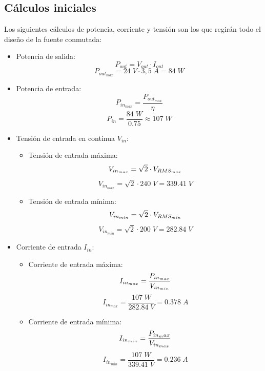 \documentclass[11pt, a4paper]{article}
\begin{document}
\subsection{Cálculos iniciales}
Los siguientes cálculos de potencia, corriente y tensión son los que regirán todo el diseño de la fuente conmutada:
\begin{itemize}
	\item Potencia de salida:
	\begin{equation}
	P_{out} = V_{out} \cdot I_{out}
	\label{Pout}
	\end{equation}
	\[ P_{out_{max}} = 24 \; V \cdot 3,5 \; A = 84 \;W \]
	\item Potencia de entrada:
	\begin{equation}
		P_{in_{max}} = \frac{P_{out_{max}}}{\eta}
	\label{Pin}
	\end{equation}
	\[ P_{in} = \frac{84 \; W}{0.75} \approx 107 \; W \]
	\item Tensión de entrada en continua $V_{in}$:
		\begin{itemize}
			\item Tensión de entrada máxima:
			\begin{equation}
				V_{in_{max}} = \sqrt{2} \cdot V_{RMS_{max}}
				\label{Vin_{max}}
			\end{equation}
			\[ V_{in_{max}} = \sqrt{2} \cdot 240 \; V = 339.41 \; V \]
			\item Tensión de entrada mínima:
			\begin{equation}
				V_{in_{min}} = \sqrt{2} \cdot V_{RMS_{min}}
				\label{Vin_{min}}
			\end{equation}
			\[ V_{in_{min}} = \sqrt{2} \cdot 200 \; V = 282.84 \; V \]
		\end{itemize}
	\item Corriente de entrada $I_{in}$:
	\begin{itemize}
		\item Corriente de entrada máxima:
		\begin{equation}
			I_{in_{max}} = \frac{P_{in_{max}}}{V_{in_{min}}}
			\label{I_{in{max}}}
		\end{equation}
		\[ I_{in_{max}} = \frac{107 \; W}{282.84 \; V} = 0.378 \; A \]
		\item Corriente de entrada mínima:
		\begin{equation}
			I_{in_{min}} = \frac{P_{in_max}}{V_{in_{max}}}
			\label{I_{in_{min}}}
		\end{equation}
		\[ I_{in_{min}} = \frac{107 \; W}{339.41 \; V} = 0.236 \; A \]
	\end{itemize}
\end{itemize}
\end{document}
